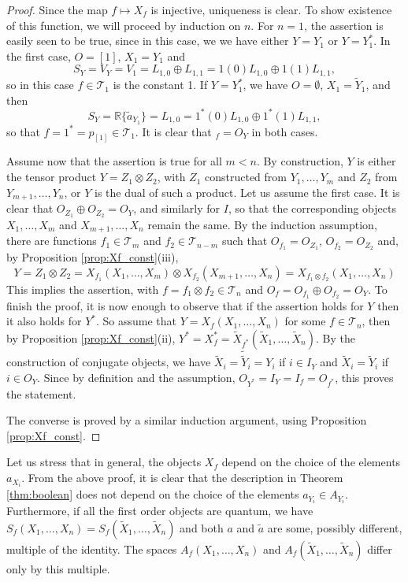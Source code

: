 \documentclass[12pt]{article}
\theoremstyle{definition}
\theoremstyle{remark}
\def\Te{\mathcal T}
\begin{document}
\begin{proof} Since the map $f\mapsto X_f$ is injective, uniqueness is clear.  To show existence of this
function, we will proceed by induction on $n$. For $n=1$, the assertion is easily seen
to be true, since in this case, we we have either $Y=Y_1$ or $Y=Y_1^*$. In the first case, $O=[1]$,
$X_1=Y_1$ and 
\[
S_Y=V_Y=V_1=L_{1,0}\oplus L_{1,1}=1(0)L_{1,0}\oplus 1(1)L_{1,1},
\]
so in this case $f\in \Te_1$ is the constant 1. If $Y=Y_1^*$, we have $O=\emptyset$, $X_1=\tilde
Y_1$, and then
\[
S_Y=\mathbb R\{\tilde a_{Y_1}\}=L_{1,0}=1^*(0)L_{1,0}\oplus 1^*(1)L_{1,1},
\]
so that $f=1^*=p_{[1]}\in \Te_1$. It is clear that $_f=O_Y$ in both cases. 

Assume now that the assertion is true for
all $m<n$. By construction, $Y$ is either the tensor
product $Y=Z_1\otimes Z_2$, with
$Z_1$ constructed from $Y_{1},\dots, Y_{m}$ and $Z_2$ from $Y_{{m+1}},\dots,
Y_{n}$,
 or $Y$ is the dual of such a product. Let us assume the first case. It is clear that
 $O_{Z_1}\oplus O_{Z_2}=O_Y$, and similarly for $I$, so that the corresponding objects
 $X_1,\dots, X_m$ and $X_{m+1},\dots,X_n$  remain the same. By the induction 
assumption, there are functions $f_1\in \Te_m$ and $f_2\in \Te_{n-m}$ such that
$O_{f_1}=O_{Z_1}$, $O_{f_2}=O_{Z_2}$ and,  by Proposition \ref{prop:Xf_const}(iii), 
\[
Y=Z_1\otimes Z_2=X_{f_1}(X_1,\dots,X_m)\otimes X_{f_2}(X_{m+1},\dots,X_n)=X_{f_1\otimes
f_2}(X_1,\dots,X_n)
\]
This implies the assertion, with $f=f_1\otimes f_2\in \Te_n$ and $O_f=O_{f_1}\oplus
O_{f_2}=O_Y$. 
To finish the proof, it is now enough to observe that if the assertion holds for $Y$ then
it also  holds for $Y^*$. So assume that $Y=X_f(X_1,\dots,X_n)$ for some $f\in \Te_n$, 
then by Proposition \ref{prop:Xf_const}(ii), $Y^*=X_f^*=\tilde X_{f^*}(\tilde X_1,\dots,\tilde X_n)$. 
By the construction of conjugate objects, we have  $\tilde X_i=\tilde{\tilde Y}_i=Y_i$
if $i\in I_{Y}$ and $\tilde X_i=\tilde {Y}_i$ if $i\in O_Y$. Since by definition and the
assumption,
$O_{Y^*}=I_Y=I_f=O_{f^*}$, this proves the statement.

The converse is proved by a similar induction argument, using Proposition
\ref{prop:Xf_const}.

\end{proof}

Let us stress that in general, the objects $X_f$ depend on the choice of the elements
$a_{X_i}$. From the above proof, it is clear that  the  description in Theorem
\ref{thm:boolean} does not depend on the choice of the elements $a_{Y_i}\in A_{Y_i}$.
Furthermore, if all the first order objects are quantum, we have
$S_f(X_1,\dots,X_n)=S_f(\tilde X_1,\dots,\tilde X_n)$ and both $a$ and $\tilde a$ are 
some, possibly different,  multiple of the identity. The spaces $A_f(X_1,\dots,X_n)$ and $A_f(\tilde X_1,\dots,\tilde
X_n)$ differ only by this multiple. 
\end{document}
